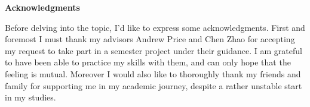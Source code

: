 \thispagestyle{empty}

\vspace*{20mm}

\begin{center}
    {\textbf{\large Acknowledgments} }
\end{center}



\noindent Before delving into the topic, I'd like to express some acknowledgments. First and foremost I must thank my advisors Andrew Price and Chen Zhao for accepting my request to take part in a semester project under their guidance. I am grateful to have been able to practice my skills with them, and can only hope that the feeling is mutual. Moreover I would also like to thoroughly thank my friends and family for supporting me in my academic journey, despite a rather unstable start in my studies.

\cleardoublepage{}
